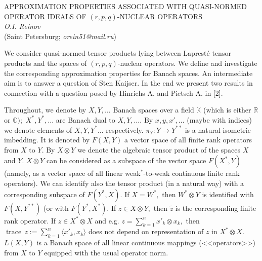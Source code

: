 

\begin{center}{APPROXIMATION PROPERTIES ASSOCIATED WITH QUASI-NORMED OPERATOR IDEALS OF
$(r,p,q)$-NUCLEAR OPERATORS}\\
{\it O.I. Reinov}\\
(Saint Petersburg;  {\it orein51@mail.ru})
\end{center}



We consider quasi-normed tensor products lying between
Laprest\'e tensor products and the spaces of $(r,p,q)$-nuclear ope\-rators.
We define and investigate the corresponding approxima\-tion pro\-per\-ties for Banach spaces.
An intermediate aim is to answer a question of Sten Kaijser.  In the end we present two results in connection with
a question posed by  Hinrichs A. and Pietsch A. in [2].

Throughout, we denote by $X,Y, \dots$ Banach spaces over a field $\mathbb K$
(which is either $\mathbb R$ or $\mathbb C);$ $X^*, Y^*,\dots$ are
Banach dual to $X, Y, \dots.$ By $x, y, x',\dots$ (maybe with indices) we denote elements of
$X, Y,  Y^*\dots$ respectively. $\pi_Y: Y\to Y^{**}$ is a natural isometric imbedding.
It is denoted by $F(X,Y)$ a vector space of all finite rank operators
from $X$ to $Y.$ By $X\otimes Y$ we denote the algebraic tensor product of the spaces
$X$ and $Y.$
  $X\otimes Y$ can be considered as a subspace of the vector space $F(X^*, Y)$
(namely, as a vector space of all linear weak${^*}$-to-weak continuous
finite rank operators). We can identify also the tensor product (in a natural way)
with a corresponding subspace of $F(Y^*,X).$ If $X=W^*,$ then
$W^*\otimes Y$ is identified with $F(X,Y^{**})$ (or with $F(Y^*,X^*).$
If $z\in X\otimes Y,$ then $\widetilde z$ is the corresponding finite rank operator.
If $z\in X^*\otimes X$ and e.g. $z=\sum_{k=1}^n x'_k\otimes x_k,$ then
   $\operatorname{trace}\, z:= \sum_{k=1}^n \langle x'_k, x_k\rangle$ does not depend on representation
   of $z$ in $X^*\otimes X.$
 $L(X,Y)$ is a Banach space of all linear continuous mappings (<<operators>>)
 from $X$ to $Y$ equipped with the usual operator norm.


